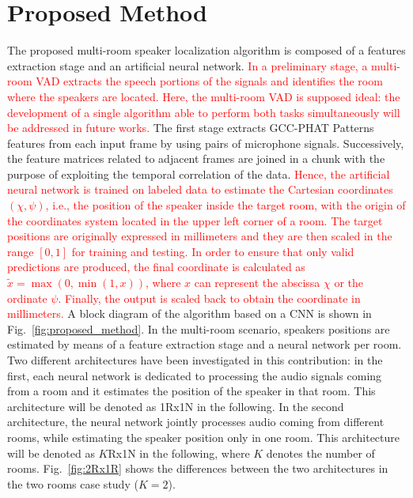 \documentclass[review]{elsarticle}
\newcommand{\figref}[1]{Fig.~\ref{#1}}
\begin{document}
\section{Proposed Method}\label{sec:ALGO}
The proposed multi-room speaker localization algorithm is composed of a features extraction stage and an artificial neural network. \textcolor{red}{In a preliminary stage, a multi-room VAD \cite{ferronineural,ijcnn2016-vad} extracts the speech portions of the signals and identifies the room where the speakers are located. Here, the multi-room VAD is supposed ideal: the development of a single algorithm able to perform both tasks simultaneously will be addressed in future works.} The first stage extracts GCC-PHAT Patterns features from each input frame by using pairs of microphone signals. Successively, the feature matrices related to adjacent frames are joined in a chunk  with the purpose of exploiting the temporal correlation of the data. \textcolor{red}{Hence, the artificial neural network is trained on labeled data to estimate the Cartesian coordinates $\left ( \chi,\psi \right )$, i.e., the position of the speaker inside the target room, with the origin of the coordinates system located in the upper left corner of a room. The target positions are originally expressed in millimeters and they are then scaled in the range $[0,1]$ for training and testing. In order to ensure that only valid predictions are produced, the final coordinate is calculated as $\tilde{x} =\max(0, \min(1, x))$, where $x$ can represent the abscissa $\chi$ or the ordinate $\psi$. Finally, the output is scaled back to obtain the coordinate in millimeters.} A block diagram of the algorithm based on a CNN is shown in \figref{fig:proposed_method}.
In the multi-room scenario, speakers positions are estimated by means of a feature extraction stage and a neural network per room. Two different architectures have been investigated in this contribution: in the first, each neural network is dedicated to processing the audio signals coming from a room and it estimates the position of the speaker in that room. This architecture will be denoted as 1Rx1N in the following. In the second architecture, the neural network jointly processes audio coming from different rooms, while estimating the speaker position only in one room. This architecture will be denoted as $K$Rx1N in the following, where $K$ denotes the number of rooms. \figref{fig:2Rx1R} shows the differences between the two architectures in the two rooms case study ($K=2$).
\end{document}
